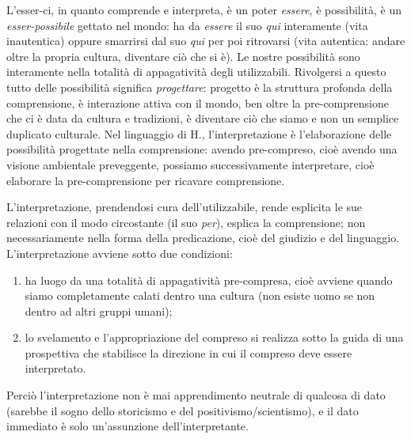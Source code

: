 \documentclass[a4paper,12pt,oneside]{article}%
\begin{document}
L'esser-ci, in quanto comprende e interpreta, è un poter \textit{essere}, è possibilità, è un \textit{esser-possibile} gettato nel mondo: ha da \textit{essere} il suo \textit{qui} interamente (vita inautentica) oppure smarrirsi dal suo \textit{qui}  per poi ritrovarsi (vita autentica: andare oltre la propria cultura, diventare ciò che si è).
Le nostre possibilità sono interamente nella totalità di appagatività degli utilizzabili. Rivolgersi a questo tutto delle possibilità significa \textit{progettare}: progetto è la struttura profonda della comprensione, è interazione attiva con il mondo, ben oltre la pre-comprensione che ci è data da cultura e tradizioni, è diventare ciò che siamo e non un semplice duplicato culturale. Nel linguaggio di H., l'interpretazione è l'elaborazione delle possibilità progettate nella comprensione: avendo pre-compreso, cioè avendo una visione ambientale preveggente, possiamo successivamente interpretare, cioè elaborare la pre-comprensione per ricavare comprensione.

L'interpretazione, prendendosi cura dell'utilizzabile, rende esplicita le sue relazioni con il modo circostante (il suo \textit{per}), esplica la comprensione; non necessariamente nella forma della predicazione, cioè del giudizio e del linguaggio. L'interpretazione avviene sotto due condizioni:

\begin{enumerate}
	\item ha luogo da una totalità di appagatività pre-compresa, cioè avviene quando siamo completamente calati dentro una cultura (non esiste uomo se non dentro ad altri gruppi umani);
	\item lo svelamento e l'appropriazione del compreso si realizza sotto la guida di una prospettiva che stabilisce la direzione in cui il compreso deve essere interpretato.
\end{enumerate}

Perciò l'interpretazione non è mai apprendimento neutrale di qualcosa di dato (sarebbe il sogno dello storicismo e del positivismo/scientismo), e il dato immediato è solo un'assunzione dell'interpretante.
\end{document}
